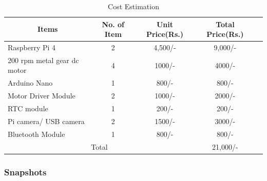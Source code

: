 \begin{table}[H]
\centering
\begin{tabular}{|l|c|c|c|c|} %
	\hline %
	\multicolumn{1}{|c|}{Items}  &No. of Item &Unit Price(Rs.) &Total Price(Rs.)\\
	\hline %
	Raspberry Pi 4 &2 &4,500/- &9,000/-\\
	\hline %
	200 rpm metal gear dc motor &4 &1000/- &4000/-\\
	\hline
	Arduino Nano &1 &800/- &800/-\\
	\hline
	Motor Driver Module &2 &1000/- &2000/-\\
	\hline
	RTC module &1 &200/- &200/-\\
	\hline
	Pi camera/ USB camera &2 &1500/- &3000/-\\
	\hline
	Bluetooth Module &1 &800/- &800/-\\
	\hline
	\multicolumn{3}{|c|}{Total} &21,000/-\\
	\hline
\end{tabular}

\caption{Cost Estimation}

\label{tblCostEstimationTable}
\end{table}


\subsubsection{Snapshots}
